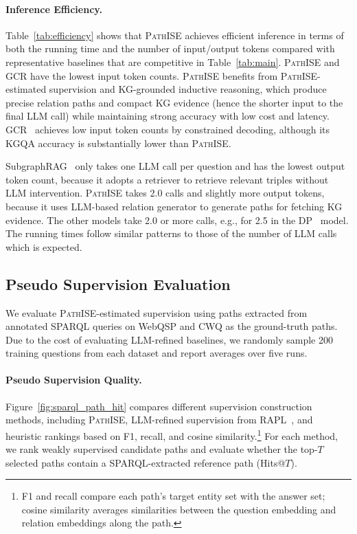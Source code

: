 \documentclass{article}
\newcommand{\framework}{\textsc{PathISE}\xspace}
\begin{document}


\paragraph{Inference Efficiency.} Table~\ref{tab:efficiency} shows that \framework{} achieves efficient inference in terms of both the running time and the number of input/output tokens compared with representative baselines that are competitive in Table~\ref{tab:main}. \framework{} and GCR have the lowest input token counts. \framework{} benefits from \framework{}-estimated supervision and KG-grounded inductive reasoning, which produce precise relation paths and compact KG evidence (hence the shorter input to the final LLM call) while maintaining strong accuracy with low cost and latency. GCR~\citep{luo_gcr_2025} achieves low input token counts by constrained decoding, although its KGQA accuracy is substantially lower than \framework{}.

SubgraphRAG~\citep{li_subgraphrag_2025} only takes one LLM call per question and has the lowest output token count, because it adopts a retriever to retrieve relevant triples without LLM intervention.
\framework{} takes 2.0 calls and slightly more output tokens, because it uses LLM-based relation generator to generate paths for fetching KG evidence.
The other models take 2.0 or more calls, e.g., for 2.5 in the DP~\citep{ma_dp_2025}  model. The running times follow similar patterns to those of the number of LLM calls which is expected.

\subsection{Pseudo Supervision Evaluation}\label{sec:sup_eval}

We evaluate \framework{}-estimated supervision using paths extracted from annotated SPARQL queries on WebQSP and CWQ as the ground-truth paths.
Due to the cost of evaluating LLM-refined baselines, we randomly sample 200 training questions from each dataset and report averages over five runs.


\paragraph{Pseudo Supervision Quality.} 



Figure~\ref{fig:sparql_path_hit} compares different supervision construction methods, including \framework{}, LLM-refined supervision from RAPL~\citep{yao_rapl_2025}, and heuristic rankings based on F1, recall, and cosine similarity.\footnote{F1 and recall compare each path's target entity set with the answer set; cosine similarity averages similarities between the question embedding and relation embeddings along the path.}
For each method, we rank weakly supervised candidate paths and evaluate whether the top-$T$ selected paths contain a SPARQL-extracted reference path (Hits@$T$).
\end{document}
